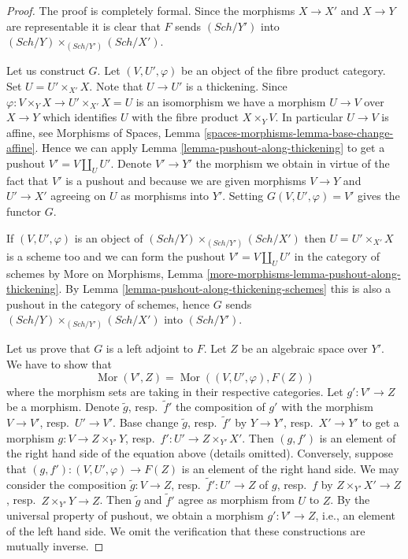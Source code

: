 \documentclass{stacks-project}
\theoremstyle{plain}
\theoremstyle{definition}
\theoremstyle{remark}
\numberwithin{equation}{subsection}
\def\Sch{\mathit{Sch}}
\def\Mor{\mathop{\mathrm{Mor}}\nolimits}
\begin{document}
\begin{proof}
The proof is completely formal.
Since the morphisms $X \to X'$ and $X \to Y$ are representable it
is clear that $F$ sends $(\Sch/Y')$ into
$(\Sch/Y) \times_{(\Sch/Y')} (\Sch/X')$.

\medskip\noindent
Let us construct $G$. Let $(V, U', \varphi)$ be an object of the fibre
product category. Set $U = U' \times_{X'} X$. Note that $U \to U'$ is a
thickening. Since $\varphi : V \times_Y X \to U' \times_{X'} X = U$ is an
isomorphism we have a morphism $U \to V$ over $X \to Y$ which identifies
$U$ with the fibre product $X \times_Y V$. In particular $U \to V$ is
affine, see
Morphisms of Spaces, Lemma \ref{spaces-morphisms-lemma-base-change-affine}.
Hence we can apply Lemma \ref{lemma-pushout-along-thickening}
to get a pushout $V' = V \amalg_U U'$. Denote $V' \to Y'$ the morphism
we obtain in virtue of the fact that $V'$ is a pushout and because
we are given morphisms $V \to Y$ and $U' \to X'$ agreeing on $U$
as morphisms into $Y'$. Setting $G(V, U', \varphi) = V'$
gives the functor $G$.

\medskip\noindent
If $(V, U', \varphi)$ is an object of $(\Sch/Y) \times_{(\Sch/Y')} (\Sch/X')$
then $U = U' \times_{X'} X$ is a scheme too and we can form the pushout
$V' = V \amalg_U U'$ in the category of schemes by
More on Morphisms, Lemma \ref{more-morphisms-lemma-pushout-along-thickening}.
By Lemma \ref{lemma-pushout-along-thickening-schemes}
this is also a pushout in the category of schemes, hence
$G$ sends $(\Sch/Y) \times_{(\Sch/Y')} (\Sch/X')$ into $(\Sch/Y')$.

\medskip\noindent
Let us prove that $G$ is a left adjoint to $F$. Let $Z$ be an algebraic space
over $Y'$. We have to show that
$$
\Mor(V', Z) = \Mor((V, U', \varphi), F(Z))
$$
where the morphism sets are taking in their respective categories.
Let $g' : V' \to Z$ be a morphism. Denote $\tilde g$, resp.\ $\tilde f'$
the composition of $g'$ with the morphism $V \to V'$, resp.\ $U' \to V'$.
Base change $\tilde g$, resp.\ $\tilde f'$ by $Y \to Y'$, resp.\ $X' \to Y'$
to get a morphism $g : V \to Z \times_{Y'} Y$,
resp.\ $f' : U' \to Z \times_{Y'} X'$. Then $(g, f')$ is an element
of the right hand side of the equation above (details omitted).
Conversely, suppose that $(g, f') : (V, U', \varphi) \to F(Z)$ is an
element of the right hand side.
We may consider the composition $\tilde g : V \to Z$,
resp.\ $\tilde f' : U' \to Z$ of $g$, resp.\ $f$ by
$Z \times_{Y'} X' \to Z$, resp.\ $Z \times_{Y'} Y \to Z$.
Then $\tilde g$ and $\tilde f'$ agree as morphism from $U$ to $Z$.
By the universal property of pushout, we obtain a morphism
$g' : V' \to Z$, i.e., an element of the left hand side.
We omit the verification that these constructions are mutually inverse.
\end{proof}
\end{document}
